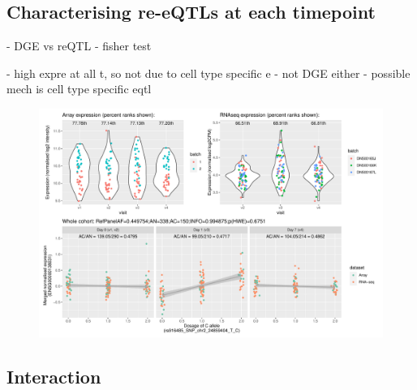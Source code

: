 \subsection{Characterising re-eQTLs at each timepoint}

%


- DGE vs reQTL
- fisher test





- high expre at all t, so not due to cell type specific e
- not DGE either
- possible mech is cell type specific eqtl

\begin{figure}
    \centering
    \includegraphics[width=1.0\textwidth,page=1]{mainmatter/figures/chapter_03/plot_dge_eqtl_genotypes.ENSG00000138031,rs916485_SNP_chr2_24859404_T_C.pdf}
    \caption{}
    \label{fig:hird_eQTL_ploteQTL_ADCY3}
\end{figure}

\subsection{Interaction}

